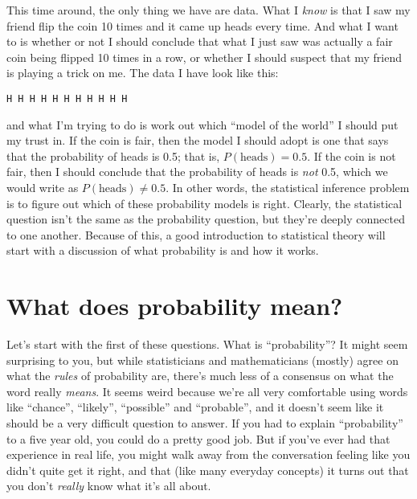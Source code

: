 \noindent
This time around, the only thing we have are data. What I {\it know} is that I saw my friend flip the coin 10 times and it came up heads every time. And what I want to  is whether or not I should conclude that what I just saw was actually a fair coin being flipped 10 times in a row, or whether I should suspect that my friend is playing a trick on me. The data I have look like this:
\begin{verbatim}
H H H H H H H H H H H
\end{verbatim}
and what I'm trying to do is work out which ``model of the world'' I should put my trust in. If the coin is fair, then the model I should adopt is one that says that the probability of heads is 0.5; that is, $P(\mbox{heads}) = 0.5$. If the coin is not fair, then I should conclude that the probability of heads is {\it not} 0.5, which we would write as $P(\mbox{heads}) \neq 0.5$. In other words, the statistical inference problem is to figure out which of these probability models is right. Clearly, the statistical question isn't the same as the probability question, but they're deeply connected to one another. Because of this, a good introduction to statistical theory will start with a discussion of what probability is and how it works.

 

\section{What does probability mean?\label{sec:probmeaning}}

Let's start with the first of these questions. What is ``probability''? It might seem surprising to you, but while statisticians and mathematicians (mostly) agree on what the {\it rules} of probability are, there's much less of a consensus on what the word really {\it means}. It seems weird because we're all very comfortable using words like ``chance'', ``likely'', ``possible'' and ``probable'', and it doesn't seem like it should be a very difficult question to answer. If you had to explain ``probability'' to a five year old, you could do a pretty good job. But if you've ever had that experience in real life, you might walk away from the conversation feeling like you didn't quite get it right, and that (like many everyday concepts) it turns out that you don't {\it really} know what it's all about. 

